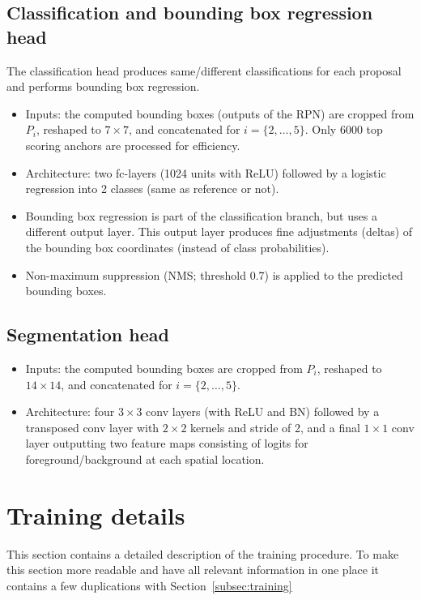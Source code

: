 \documentclass{article}
\begin{document}
\subsection{Classification and bounding box regression head}
The classification head produces same/different classifications for each proposal and performs bounding box regression.

\begin{itemize}[nosep]
    \item Inputs: the computed bounding boxes (outputs of the RPN) are cropped from  $P_i$, reshaped to $7 \times 7$, and concatenated for $i = \{2,\ldots,5\}$. Only 6000 top scoring anchors are processed for efficiency.
    \item Architecture: two fc-layers (1024 units with ReLU) followed by a logistic regression into 2 classes (same as reference or not).
    \item Bounding box regression is part of the classification branch, but uses a different output layer. This output layer produces fine adjustments (deltas) of the bounding box coordinates (instead of class probabilities).
    \item Non-maximum suppression (NMS; threshold 0.7) is applied to the predicted bounding boxes.
\end{itemize}

\subsection{Segmentation head}
\begin{itemize}[nosep]
    \item Inputs: the computed bounding boxes are cropped from  $P_i$, reshaped to $14 \times 14$, and concatenated for $i = \{2,\ldots,5\}$.
    \item Architecture: four $3\times3$ conv layers (with ReLU and BN) followed by a transposed conv layer with $2\times2$ kernels and stride of 2, and a final $1\times1$ conv layer outputting two feature maps consisting of logits for foreground/background at each spatial location.
\end{itemize}

\section{Training details}
\label{appendix:training}

This section contains a detailed description of the training procedure. To make this section more readable and have all relevant information in one place it contains a few duplications with Section~\ref{subsec:training}
\end{document}
